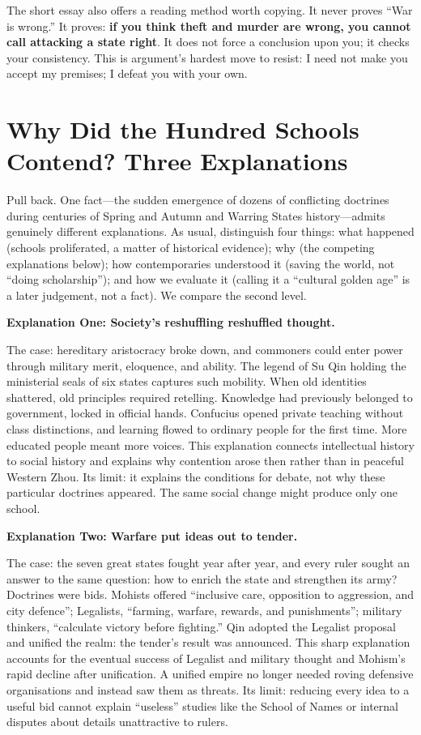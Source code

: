 The short essay also offers a reading method worth copying. It never proves ``War is wrong.'' It proves: \textbf{if you think theft and murder are wrong, you cannot call attacking a state right}. It does not force a conclusion upon you; it checks your consistency. This is argument's hardest move to resist: I need not make you accept my premises; I defeat you with your own.

\section[Why the Schools Contended]{Why Did the Hundred Schools Contend? Three Explanations}
Pull back. One fact---the sudden emergence of dozens of conflicting doctrines during centuries of Spring and Autumn and Warring States history---admits genuinely different explanations. As usual, distinguish four things: what happened (schools proliferated, a matter of historical evidence); why (the competing explanations below); how contemporaries understood it (saving the world, not ``doing scholarship''); and how we evaluate it (calling it a ``cultural golden age'' is a later judgement, not a fact). We compare the second level.

\textbf{Explanation One: Society's reshuffling reshuffled thought.}

The case: hereditary aristocracy broke down, and commoners could enter power through military merit, eloquence, and ability. The legend of Su Qin holding the ministerial seals of six states captures such mobility. When old identities shattered, old principles required retelling. Knowledge had previously belonged to government, locked in official hands. Confucius opened private teaching without class distinctions, and learning flowed to ordinary people for the first time. More educated people meant more voices. This explanation connects intellectual history to social history and explains why contention arose then rather than in peaceful Western Zhou. Its limit: it explains the conditions for debate, not why these particular doctrines appeared. The same social change might produce only one school.

\textbf{Explanation Two: Warfare put ideas out to tender.}

The case: the seven great states fought year after year, and every ruler sought an answer to the same question: how to enrich the state and strengthen its army? Doctrines were bids. Mohists offered ``inclusive care, opposition to aggression, and city defence''; Legalists, ``farming, warfare, rewards, and punishments''; military thinkers, ``calculate victory before fighting.'' Qin adopted the Legalist proposal and unified the realm: the tender's result was announced. This sharp explanation accounts for the eventual success of Legalist and military thought and Mohism's rapid decline after unification. A unified empire no longer needed roving defensive organisations and instead saw them as threats. Its limit: reducing every idea to a useful bid cannot explain ``useless'' studies like the School of Names or internal disputes about details unattractive to rulers.

